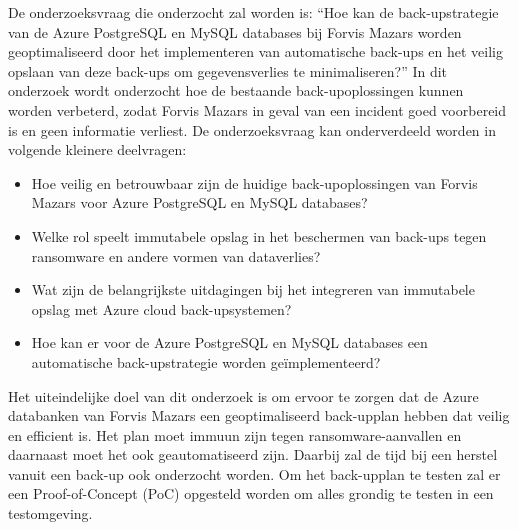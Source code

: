 De onderzoeksvraag die onderzocht zal worden is: ``Hoe kan de back-upstrategie van de Azure PostgreSQL en MySQL databases bij Forvis Mazars worden geoptimaliseerd door het implementeren van automatische back-ups en het veilig opslaan van deze back-ups om gegevensverlies te minimaliseren?'' In dit onderzoek wordt onderzocht hoe de bestaande back-upoplossingen kunnen worden verbeterd, zodat Forvis Mazars in geval van een incident goed voorbereid is en geen informatie verliest. De onderzoeksvraag kan onderverdeeld worden in volgende kleinere deelvragen:
\begin{itemize}
    \item Hoe veilig en betrouwbaar zijn de huidige back-upoplossingen van Forvis Mazars voor Azure PostgreSQL en MySQL databases?
    \item Welke rol speelt immutabele opslag in het beschermen van back-ups tegen ransomware en andere vormen van dataverlies?
    \item Wat zijn de belangrijkste uitdagingen bij het integreren van immutabele opslag met Azure cloud back-upsystemen?
    \item Hoe kan er voor de Azure PostgreSQL en MySQL databases een automatische back-upstrategie worden geïmplementeerd?
\end{itemize}

Het uiteindelijke doel van dit onderzoek is om ervoor te zorgen dat de Azure databanken van Forvis Mazars een geoptimaliseerd back-upplan hebben dat veilig en efficient is. Het plan moet immuun zijn tegen ransomware-aanvallen en daarnaast moet het ook geautomatiseerd zijn. Daarbij zal de tijd bij een herstel vanuit een back-up ook onderzocht worden. Om het back-upplan te testen zal er een Proof-of-Concept (PoC) opgesteld worden om alles grondig te testen in een testomgeving. 


